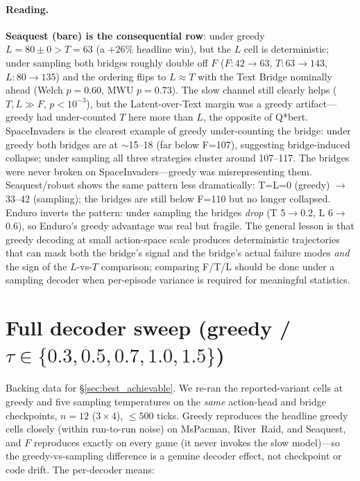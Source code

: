 \documentclass[11pt]{article}
\begin{document}
\paragraph{Reading.}
\textbf{Seaquest (bare) is the consequential row}: under greedy $L\!=\!80\!\pm\!0 > T\!=\!63$ (a
$+26\%$ headline win), but the $L$ cell is deterministic; under sampling both bridges roughly
double off $F$ ($F\!:\!42\!\to\!63$, $T\!:\!63\!\to\!143$, $L\!:\!80\!\to\!135$) and the ordering
flips to $L\!\approx\!T$ with the Text Bridge nominally ahead (Welch $p\!=\!0.60$, MWU $p\!=\!0.73$). The
slow channel still clearly helps ($T,L\!\gg\!F$, $p\!<\!10^{-3}$), but the Latent-over-Text margin
was a greedy artifact---greedy had under-counted $T$ here more than $L$, the opposite of Q*bert.
SpaceInvaders is the clearest example of greedy under-counting the bridge: under greedy both bridges are at $\sim$15--18 (far below F=107), suggesting bridge-induced collapse; under sampling all three strategies cluster around 107--117. The bridges were never broken on SpaceInvaders---greedy was misrepresenting them. Seaquest/robust shows the same pattern less dramatically: T=L=0 (greedy) $\to$ 33--42 (sampling); the bridges are still below F=110 but no longer collapsed. Enduro inverts the pattern: under sampling the bridges \emph{drop} (T 5$\to$0.2, L 6$\to$0.6), so Enduro's greedy advantage was real but fragile. The general lesson is that greedy decoding at small action-space scale produces deterministic trajectories that can mask both the bridge's signal and the bridge's actual failure modes \emph{and} the sign of the $L$-vs-$T$ comparison; comparing F/T/L should be done under a sampling decoder when per-episode variance is required for meaningful statistics.

\section{Full decoder sweep (greedy / $\tau\in\{0.3,0.5,0.7,1.0,1.5\}$)}
\label{app:decoder_sweep}

Backing data for \S\ref{sec:best_achievable}. We re-ran the reported-variant cells at greedy and
five sampling temperatures on the \emph{same} action-head and bridge checkpoints, $n\!=\!12$ ($3\!\times\!4$),
$\le\!500$ ticks. Greedy reproduces the headline greedy cells closely (within run-to-run noise) on
MsPacman, River~Raid, and Seaquest, and $F$ reproduces exactly on every game (it never invokes the
slow model)---so the greedy-vs-sampling difference
is a genuine decoder effect, not checkpoint or code drift. The per-decoder means:
\end{document}
